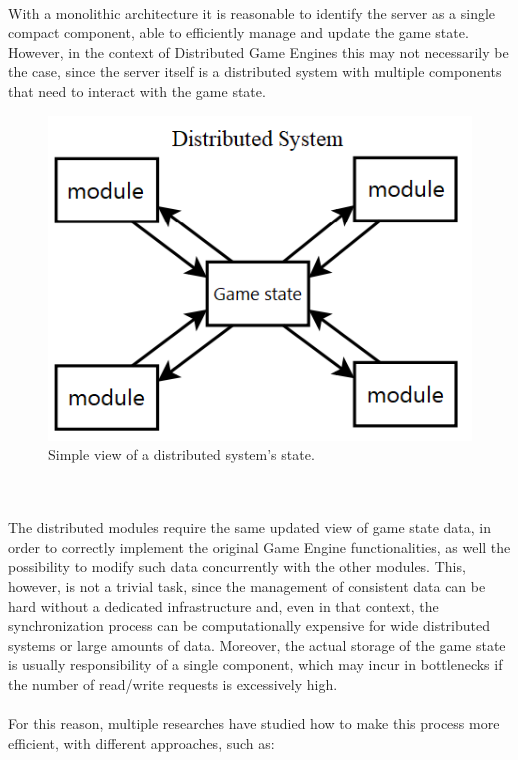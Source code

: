 \\ With a monolithic architecture it is reasonable to identify the server as a single compact component, able to efficiently manage and update the game state. However, in the context of Distributed Game Engines this may not necessarily be the case, since the server itself is a distributed system with multiple components that need to interact with the game state.
\begin{figure}
	\centering
	\includegraphics[width=0.55\linewidth]{immagini/State-of-the-art/simple-distributed-state}
	\caption[Simple view of a distributed system's state.]{Simple view of a distributed system's state.}
	\label{fig:simple-distributed-state}
\end{figure}
\\ \\The distributed modules require the same updated view of game state data, in order to correctly implement the original Game Engine functionalities, as well the possibility to modify such data concurrently with the other modules. This, however, is not a trivial task, since the management of consistent data can be hard without a dedicated infrastructure and, even in that context, the synchronization process can be computationally expensive for wide distributed systems or large amounts of data. Moreover, the actual storage of the game state is usually responsibility of a single component, which may incur in bottlenecks if the number of read/write requests is excessively high. \\ \\
For this reason, multiple researches \cite{womak:consistency-models-cloud-games, womak:distributed-minecraft, womak:distributed-game-engine-android} have studied how to make this process more efficient, with different approaches, such as:
